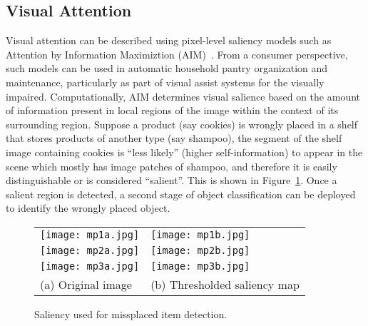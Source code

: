 
\subsection{Visual Attention}
Visual attention can be described using pixel-level saliency models such as Attention by Information Maximiztion (AIM)~\cite{Bruceb}.
From a consumer perspective, such models can be used in automatic household pantry organization and maintenance, particularly 
as part of visual assist systems for the visually impaired. Computationally, AIM determines visual salience based on the amount of information present in 
local regions of the image within the context of its surrounding region. 
Suppose a product (say cookies) is wrongly placed in a shelf that stores products of another type (say shampoo), the segment of the shelf image containing cookies is 
``less likely'' (higher self-information) to appear in the scene which mostly has image patches of shampoo, 
and therefore it is easily distinguishable or is considered ``salient''. This is shown in Figure~\ref{tab:saliencya}.
Once a salient region is detected, a second stage of object classification can be deployed to identify the wrongly placed object.  

\begin{figure}[!htb]
\centering
\begin{tabular}{@{}l@{} @{}l@{}}
\vspace{-5pt}
\texttt{[image: mp1a.jpg]} & \texttt{[image: mp1b.jpg]}\\[\abovecaptionskip]
\texttt{[image: mp2a.jpg]} & \texttt{[image: mp2b.jpg]}\\[\abovecaptionskip]
\texttt{[image: mp3a.jpg]} & \texttt{[image: mp3b.jpg]}\\[\abovecaptionskip]
\small(a) Original image & \small (b) Thresholded saliency map\\
\end{tabular}
\caption{Saliency used for missplaced item detection.}
\label{tab:saliencya}
\end{figure}


